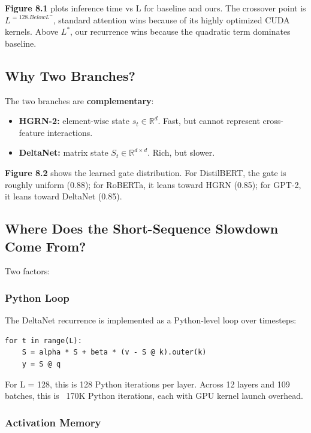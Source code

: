 \textbf{Figure 8.1} plots inference time vs L for baseline and ours. The 
crossover point is $L^\textit{ = 128$. Below $L^}$, standard attention 
wins because of its highly optimized CUDA kernels. Above $L^*$, our 
recurrence wins because the quadratic term dominates baseline.

\subsection{Why Two Branches?}

The two branches are \textbf{complementary}:

\begin{itemize}
\item \textbf{HGRN-2:} element-wise state $s_t \in \mathbb{R}^d$. Fast, but cannot
  represent cross-feature interactions.
\item \textbf{DeltaNet:} matrix state $S_t \in \mathbb{R}^{d \times d}$. Rich, but
  slower.

\end{itemize}
\textbf{Figure 8.2} shows the learned gate distribution. For DistilBERT, the gate 
is roughly uniform (0.88); for RoBERTa, it leans toward HGRN 
(0.85); for GPT-2, it leans toward DeltaNet (0.85).

\subsection{Where Does the Short-Sequence Slowdown Come From?}

Two factors:

\subsubsection{Python Loop}

The DeltaNet recurrence is implemented as a Python-level loop over timesteps:

\begin{lstlisting}
for t in range(L):
    S = alpha * S + beta * (v - S @ k).outer(k)
    y = S @ q
\end{lstlisting}

For L = 128, this is 128 Python iterations per layer. Across 12 layers and 
109 batches, this is ~170K Python iterations, each with GPU kernel launch 
overhead.

\subsubsection{Activation Memory}

